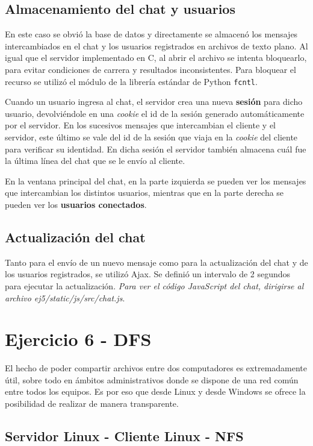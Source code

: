 \subsection{Almacenamiento del chat y usuarios}

En este caso se obvió la base de datos y directamente se almacenó los mensajes intercambiados en el chat y los usuarios registrados en archivos de texto plano. Al igual que el servidor implementado en C, al abrir el archivo se intenta bloquearlo, para evitar condiciones de carrera y resultados inconsistentes. Para bloquear el recurso se utilizó el módulo de la librería estándar de Python \texttt{fcntl}. 

Cuando un usuario ingresa al chat, el servidor crea una nueva \textbf{sesión} para dicho usuario, devolviéndole en una \emph{cookie} el id de la sesión generado automáticamente por el servidor. En los sucesivos mensajes que intercambian el cliente y el servidor, este último se vale del id de la sesión que viaja en la \emph{cookie} del cliente para verificar su identidad. En dicha sesión el servidor también almacena cuál fue la última línea del chat que se le envío al cliente.

En la ventana principal del chat, en la parte izquierda se pueden ver los mensajes que intercambian los distintos usuarios, mientras que en la parte derecha se pueden ver los \textbf{usuarios conectados}. 

\subsection{Actualización del chat}

Tanto para el envío de un nuevo mensaje como para la actualización del chat y de los usuarios registrados, se utilizó Ajax. Se definió un intervalo de 2 segundos para ejecutar la actualización. \emph{Para ver el código JavaScript del chat, dirigirse al archivo ej5/static/js/src/chat.js}.


\section{Ejercicio 6 - DFS}

El hecho de poder compartir archivos entre dos computadores es extremadamente útil, sobre todo en ámbitos administrativos donde se dispone de una red común entre todos los equipos. Es por eso que desde Linux y desde Windows se ofrece la posibilidad de realizar de manera transparente.

\subsection{Servidor Linux - Cliente Linux - NFS}

